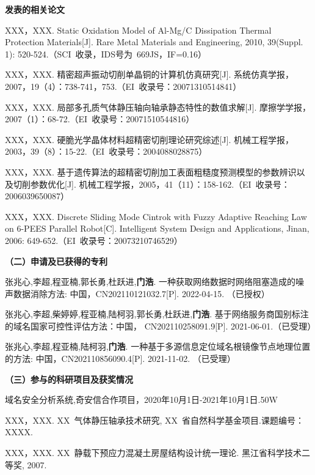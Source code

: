 \begin{publication}
\noindent\textbf{发表的相关论文}
\begin{publist}
\item	XXX，XXX. Static Oxidation Model of Al-Mg/C Dissipation Thermal Protection Materials[J]. Rare Metal Materials and Engineering, 2010, 39(Suppl. 1): 520-524.（SCI~收录，IDS号为~669JS，IF=0.16）
\item XXX，XXX. 精密超声振动切削单晶铜的计算机仿真研究[J]. 系统仿真学报，2007，19（4）：738-741，753.（EI~收录号：20071310514841）
\item XXX，XXX. 局部多孔质气体静压轴向轴承静态特性的数值求解[J]. 摩擦学学报，2007（1）：68-72.（EI~收录号：20071510544816）
\item XXX，XXX. 硬脆光学晶体材料超精密切削理论研究综述[J]. 机械工程学报，2003，39（8）：15-22.（EI~收录号：2004088028875）
\item XXX，XXX. 基于遗传算法的超精密切削加工表面粗糙度预测模型的参数辨识以及切削参数优化[J]. 机械工程学报，2005，41（11）：158-162.（EI~收录号：2006039650087）
\item XXX，XXX. Discrete Sliding Mode Cintrok with Fuzzy Adaptive Reaching Law on 6-PEES Parallel Robot[C]. Intelligent System Design and Applications, Jinan, 2006: 649-652.（EI~收录号：20073210746529）
\end{publist}

\noindent\textbf{（二）申请及已获得的专利}
\begin{publist}
\item 张兆心,李超,程亚楠,郭长勇,杜跃进,\textbf{门浩}. 一种获取网络数据时网络阻塞造成的噪声数据消除方法: 中国，CN202110121032.7[P]. 2022-04-15. （已授权）

\item 张兆心,李超,柴婷婷,程亚楠,陆柯羽,郭长勇,杜跃进,\textbf{门浩}. 基于网络服务商国别标注的域名国家可控性评估方法：中国， CN202110258091.9[P]. 2021-06-01.（已受理）

\item 张兆心,李超,程亚楠,陆柯羽,\textbf{门浩}. 一种基于多源信息定位域名根镜像节点地理位置的方法: 中国，CN202110856090.4[P]. 2021-11-02. （已受理）


\end{publist}

\noindent\textbf{（三）参与的科研项目及获奖情况}
\begin{publist}
\item 域名安全分析系统,奇安信合作项目，2020年10月1日-2021年10月1日.50W
\item	XXX，XXX. XX~气体静压轴承技术研究, XX~省自然科学基金项目.课题编号：XXXX.
\item XXX，XXX. XX~静载下预应力混凝土房屋结构设计统一理论. 黑江省科学技术二等奖, 2007.
\end{publist}
\end{publication}
